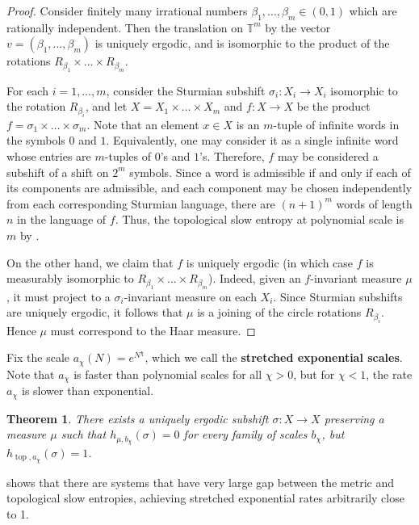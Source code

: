 \documentclass[oneside]{amsart}
\theoremstyle{plain}
\newtheorem{THM}{Theorem}[section]
\theoremstyle{definition}
\newcommand{\<}{\langle}
\renewcommand{\>}{\rangle}
\newcommand{\topo}{\operatorname{top}}
\renewcommand{\|}{|\!|} %
\begin{document}
\begin{proof}
Consider finitely many irrational numbers $\beta_1,\dots,\beta_m \in (0,1)$ which are rationally independent. Then the translation on $\mathbb{T}^m$ by the vector $v = (\beta_1,\dots,\beta_m)$ is uniquely ergodic, and is isomorphic to the product of the rotations $R_{\beta_1}\times \dots \times R_{\beta_m}$.

For each $i = 1,\dots,m$, consider the Sturmian subshift $\sigma_i : X_i \to X_i$ isomorphic to the rotation $R_{\beta_i}$, and let $X = X_1\times \dots \times X_m$ and $f : X \to X$ be the product $f = \sigma_1 \times \dots \times \sigma_m$. Note that an element $x \in X$ is an $m$-tuple of infinite words in the symbols $0$ and $1$. Equivalently, one may consider it as a single infinite word whose entries are $m$-tuples of $0$'s and $1$'s. Therefore, $f$ may be considered a subshift of a shift on $2^m$ symbols. Since a word is admissible if and only if each of its components are admissible, and each component may be chosen independently from each corresponding Sturmian language, there are $(n+1)^m$ words of length $n$ in the language of $f$. Thus, the topological slow entropy at polynomial scale is $m$ by .

On the other hand, we claim that $f$ is uniquely ergodic (in which case $f$ is measurably isomorphic to $R_{\beta_1}\times \dots \times R_{\beta_m}$). Indeed, given an $f$-invariant measure $\mu$, it must project to a $\sigma_i$-invariant measure on each $X_i$. Since Sturmian subshifts are uniquely ergodic, it follows that $\mu$ is a joining of the circle rotations $R_{\beta_i}$. Hence $\mu$ must correspond to the Haar measure.
\end{proof}

Fix the scale $a_\chi(N) = e^{N^\chi}$, which we call the {\bf stretched exponential scales}. Note that $a_\chi$ is faster than polynomial scales for all $\chi > 0$, but for $\chi < 1$, the rate $a_\chi$ is slower than exponential.

\begin{THM}
\label{thm:big-gap}
    There exists a uniquely ergodic subshift $\sigma : X \to X$ preserving a measure $\mu$ such that $h_{\mu,b_\chi}(\sigma) = 0$ for every family of scales $b_\chi$, but $h_{\topo,a_\chi}(\sigma) = 1$.
\end{THM}

 shows that there are systems that have very large gap between the metric and topological slow entropies, achieving stretched exponential rates arbitrarily close to 1.
\end{document}
